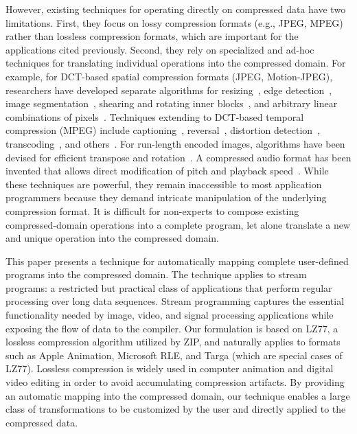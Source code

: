 However, existing techniques for operating directly on compressed data
have two limitations.  First, they focus on lossy compression formats
(e.g., JPEG, MPEG) rather than lossless compression formats, which are
important for the applications cited previously.  Second, they rely on
specialized and ad-hoc techniques for translating individual
operations into the compressed domain.  For example, for DCT-based
spatial compression formats (JPEG, Motion-JPEG), researchers have
developed separate algorithms for resizing~\cite{dugad01,mukherjee02},
edge detection~\cite{shen96b,shen96}, image
segmentation~\cite{feng03}, shearing and rotating inner
blocks~\cite{shen98}, and arbitrary linear combinations of
pixels~\cite{smith96b}.  Techniques extending to DCT-based temporal
compression (MPEG) include captioning~\cite{nang00},
reversal~\cite{vasudev98}, distortion detection~\cite{dorai00},
transcoding~\cite{smith98}, and others~\cite{wee02survey}.  For
run-length encoded images, algorithms have been devised for efficient
transpose and rotation~\cite{misra99,shoji95}.  A compressed audio
format has been invented that allows direct modification of pitch and
playback speed~\cite{levine98}.  While these techniques are powerful,
they remain inaccessible to most application programmers because they
demand intricate manipulation of the underlying compression format.
It is difficult for non-experts to compose existing compressed-domain
operations into a complete program, let alone translate a new and
unique operation into the compressed domain.

This paper presents a technique for automatically mapping complete
user-defined programs into the compressed domain.  The technique
applies to stream programs: a restricted but practical class of
applications that perform regular processing over long data sequences.
Stream programming captures the essential functionality needed by
image, video, and signal processing applications while exposing the
flow of data to the compiler.  Our formulation is based on LZ77, a
lossless compression algorithm utilized by ZIP, and naturally applies
to formats such as Apple Animation, Microsoft RLE, and Targa (which
are special cases of LZ77).  Lossless compression is widely used in
computer animation and digital video editing in order to avoid
accumulating compression artifacts.  By providing an automatic mapping
into the compressed domain, our technique enables a large class of
transformations to be customized by the user and directly applied to
the compressed data.

